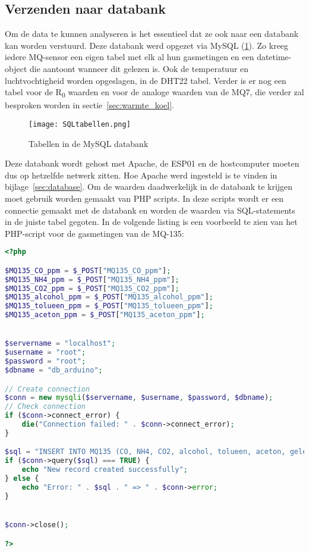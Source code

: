 \subsection{Verzenden naar databank}
\label{subsec:database}

Om de data te kunnen analyseren is het essentieel dat ze ook naar een databank kan worden verstuurd. Deze databank werd opgezet via MySQL (\ref{fig:SQLtabellen}). Zo kreeg iedere MQ-sensor een eigen tabel met elk al hun gasmetingen en een datetime-object die aantoont wanneer dit gelezen is. Ook de temperatuur en luchtvochtigheid worden opgeslagen, in de DHT22 tabel. Verder is er nog een tabel voor de R\textsubscript{0} waarden en voor de analoge waarden van de MQ7, die verder zal besproken worden in sectie~\ref{sec:warmte_koel}.

\begin{figure}[h]
    \texttt{[image: SQLtabellen.png]}
    \caption[Tabellen in de databank]{Tabellen in de MySQL databank}
    \label{fig:SQLtabellen}
\end{figure}

Deze databank wordt gehost met Apache, de ESP01 en de hostcomputer moeten dus op hetzelfde netwerk zitten. Hoe Apache werd ingesteld is te vinden in bijlage~\ref{sec:database}. Om de waarden daadwerkelijk in de databank te krijgen moet gebruik worden gemaakt van PHP scripts. In deze scripts wordt er een connectie gemaakt met de databank en worden de waarden via SQL-statements in de juiste tabel gegoten. In de volgende listing is een voorbeeld te zien van het PHP-script voor de gasmetingen van de MQ-135:
\begin{lstlisting}[language=PHP,caption={PHP-script MQ-135}]
<?php

$MQ135_CO_ppm = $_POST["MQ135_CO_ppm"];
$MQ135_NH4_ppm = $_POST["MQ135_NH4_ppm"];
$MQ135_CO2_ppm = $_POST["MQ135_CO2_ppm"];
$MQ135_alcohol_ppm = $_POST["MQ135_alcohol_ppm"];
$MQ135_tolueen_ppm = $_POST["MQ135_tolueen_ppm"];
$MQ135_aceton_ppm = $_POST["MQ135_aceton_ppm"];


$servername = "localhost";
$username = "root";
$password = "root";
$dbname = "db_arduino";

// Create connection
$conn = new mysqli($servername, $username, $password, $dbname);
// Check connection
if ($conn->connect_error) {
    die("Connection failed: " . $conn->connect_error);
}

$sql = "INSERT INTO MQ135 (CO, NH4, CO2, alcohol, tolueen, aceton, gelezen_op) VALUES ($MQ135_CO_ppm, $MQ135_NH4_ppm, $MQ135_CO2_ppm, $MQ135_alcohol_ppm, $MQ135_tolueen_ppm, $MQ135_aceton_ppm, NOW())";
if ($conn->query($sql) === TRUE) {
    echo "New record created successfully";
} else {
    echo "Error: " . $sql . " => " . $conn->error;
}


$conn->close();

?>

\end{lstlisting}

